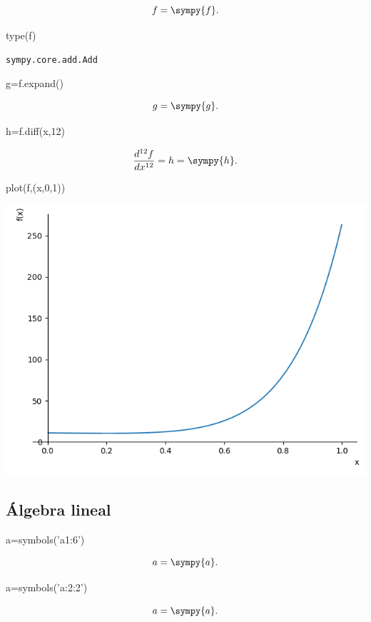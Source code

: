 $$f=\sympy{f}.$$
 
\begin{sympyblock}
type(f)
\end{sympyblock}

\texttt{sympy.core.add.Add}

\begin{sympyblock}
g=f.expand()
\end{sympyblock}

$$g=\sympy{g}.$$

\begin{sympyblock}
h=f.diff(x,12)
\end{sympyblock}
$$\frac{d^{12} f}{dx^{12}}=h=\sympy{h}.$$

\begin{sympyverbatim}
plot(f,(x,0,1))
\end{sympyverbatim}

\begin{center}
\includegraphics[scale=.3]{imagenes/sympy_1.png}
\end{center}


\subsection{Álgebra lineal}

\begin{sympyblock}
a=symbols('a1:6')
\end{sympyblock}
$$a=\sympy{a}.$$

\begin{sympyblock}
a=symbols('a:2:2')
\end{sympyblock}
$$a=\sympy{a}.$$

